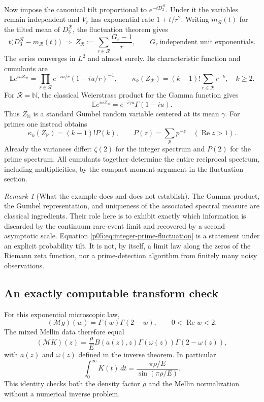\documentclass[11pt,letterpaper]{article}
\theoremstyle{definition}
\theoremstyle{remark}
\newtheorem{remark}[theorem]{Remark}
\renewcommand{\Re}{\operatorname{Re}}
\newcommand{\1}{\mathbf 1}
\begin{document}
Now impose the canonical tilt proportional to $e^{-tD_2^{\mathcal R}}$.
Under it the variables remain independent and $V_r$ has exponential
rate $1+t/r^2$. Writing $m_{\mathcal R}(t)$ for the tilted mean of
$D_3^{\mathcal R}$, the fluctuation theorem gives
\begin{equation}\label{p05:eq:integer-prime-fluctuation}
 t\bigl(D_3^{\mathcal R}-m_{\mathcal R}(t)\bigr)
 \ \Longrightarrow\ Z_{\mathcal R}
 :=\sum_{r\in\mathcal R}\frac{G_r-1}{r},
 \qquad G_r\ \text{independent unit exponentials}.
\end{equation}
The series converges in $L^2$ and almost surely. Its characteristic
function and cumulants are
\[
 \mathbb E e^{iuZ_{\mathcal R}}
 =\prod_{r\in\mathcal R}e^{-iu/r}(1-iu/r)^{-1},
 \qquad
 \kappa_k(Z_{\mathcal R})=(k-1)!\sum_{r\in\mathcal R}r^{-k},\quad k\ge2.
\]
For $\mathcal R=\mathbb N$, the classical Weierstrass product
for the Gamma function \cite{DLMF} gives
\[
 \mathbb E e^{iuZ_{\mathbb N}}=e^{-i\gamma u}\Gamma(1-iu).
\]
Thus $Z_{\mathbb N}$ is a standard Gumbel random variable centered at
its mean $\gamma$. For primes one instead obtains
\[
 \kappa_k(Z_{\mathbb P})=(k-1)!P(k),\qquad
 P(z)=\sum_p p^{-z}\quad(\Re z>1).
\]
Already the variances differ: $\zeta(2)$ for the integer spectrum and
$P(2)$ for the prime spectrum. All cumulants together determine the
entire reciprocal spectrum, including multiplicities, by the compact
moment argument in the fluctuation section.

\begin{remark}[What the example does and does not establish]
The Gamma product, the Gumbel representation, and uniqueness of the
associated spectral measure are classical ingredients. Their role
here is to exhibit exactly which information is discarded by the
continuum rare-event limit and recovered by a second asymptotic scale.
Equation \eqref{p05:eq:integer-prime-fluctuation} is a statement under an
explicit probability tilt. It is not, by itself, a limit law along
the zeros of the Riemann zeta function, nor a prime-detection algorithm
from finitely many noisy observations.
\end{remark}

\subsection{An exactly computable transform check}
For this exponential microscopic law,
\[
 (\mathcal M g)(w)=\Gamma(w)\Gamma(2-w),\qquad 0<\Re w<2.
\]
The mixed Mellin data therefore equal
\[
 (\mathcal M K)(z)
 =\frac{\rho}{E}B(a(z),z)\Gamma(\omega(z))\Gamma(2-\omega(z)),
\]
with $a(z)$ and $\omega(z)$ defined in the inverse theorem.
In particular
\[
 \int_0^\infty K(t)\,dt
 =\frac{\pi\rho/E}{\sin(\pi\rho/E)}.
\]
This identity checks both the density factor $\rho$ and the Mellin
normalization without a numerical inverse problem.
\end{document}
